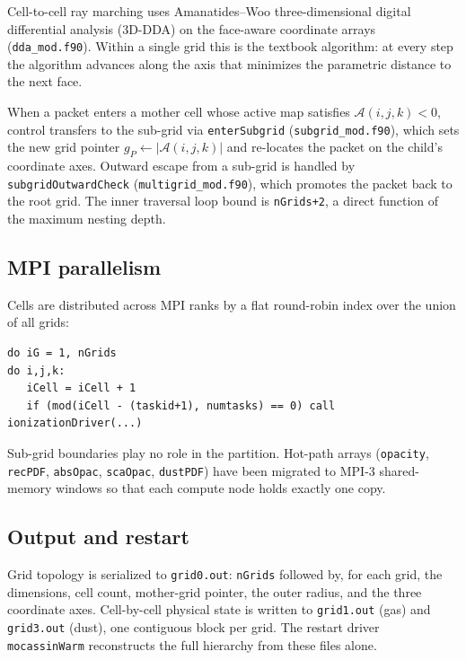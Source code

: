 \documentclass[11pt,a4paper]{my_memo}
\begin{document}
Cell-to-cell ray marching uses Amanatides--Woo three-dimensional digital
differential analysis (3D-DDA) on the face-aware coordinate arrays
(\texttt{dda\_mod.f90}).  Within a single grid this is the textbook
algorithm: at every step the algorithm advances along the axis that minimizes
the parametric distance to the next face.

\begin{sloppypar}
When a packet enters a mother cell whose active map satisfies
$\mathcal{A}(i,j,k) < 0$, control transfers to the sub-grid via
\texttt{enterSubgrid} (\texttt{subgrid\_mod.f90}), which sets the new grid
pointer $g_P \leftarrow |\mathcal{A}(i,j,k)|$ and re-locates the packet on
the child's coordinate axes.  Outward escape from a sub-grid is handled by
\texttt{subgridOutwardCheck} (\texttt{multigrid\_mod.f90}), which promotes
the packet back to the root grid.  The inner traversal loop bound is
\texttt{nGrids+2}, a direct function of the maximum nesting depth.
\end{sloppypar}

\subsection{MPI parallelism}

Cells are distributed across MPI ranks by a flat round-robin index over the
union of all grids:
\begin{lstlisting}
do iG = 1, nGrids
do i,j,k:
   iCell = iCell + 1
   if (mod(iCell - (taskid+1), numtasks) == 0) call ionizationDriver(...)
\end{lstlisting}
\begin{sloppypar}
Sub-grid boundaries play no role in the partition.  Hot-path arrays
(\texttt{opacity}, \texttt{recPDF}, \texttt{absOpac}, \texttt{scaOpac},
\texttt{dustPDF}) have been migrated to MPI-3 shared-memory windows so that
each compute node holds exactly one copy.
\end{sloppypar}

\subsection{Output and restart}

Grid topology is serialized to \texttt{grid0.out}: \texttt{nGrids} followed
by, for each grid, the dimensions, cell count, mother-grid pointer, the
outer radius, and the three coordinate axes.  Cell-by-cell physical state is
written to \texttt{grid1.out} (gas) and \texttt{grid3.out} (dust), one
contiguous block per grid.  The restart driver \texttt{mocassinWarm}
reconstructs the full hierarchy from these files alone.
\end{document}

